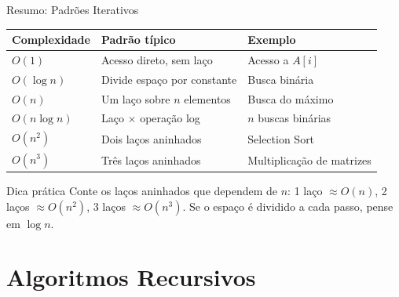 \documentclass[aspectratio=169]{beamer}
\begin{document}
\begin{frame}[shrink]{Resumo: Padrões Iterativos}
  \begin{center}
  \renewcommand{\arraystretch}{1.3}
  \begin{tabular}{lll}
    \toprule
    \textbf{Complexidade} & \textbf{Padrão típico} & \textbf{Exemplo} \\
    \midrule
    $O(1)$           & Acesso direto, sem laço           & Acesso a $A[i]$ \\
    $O(\log n)$      & Divide espaço por constante       & Busca binária \\
    $O(n)$           & Um laço sobre $n$ elementos       & Busca do máximo \\
    $O(n \log n)$    & Laço $\times$ operação log        & $n$ buscas binárias \\
    $O(n^2)$         & Dois laços aninhados              & Selection Sort \\
    $O(n^3)$         & Três laços aninhados              & Multiplicação de matrizes \\
    \bottomrule
  \end{tabular}
  \end{center}

  \vspace{0.3cm}
  \begin{alertblock}{Dica prática}
    Conte os laços aninhados que dependem de $n$: 1 laço $\approx O(n)$,
    2 laços $\approx O(n^2)$, 3 laços $\approx O(n^3)$.
    Se o espaço é dividido a cada passo, pense em $\log n$.
  \end{alertblock}
\end{frame}

\section{Algoritmos Recursivos}
\end{document}
